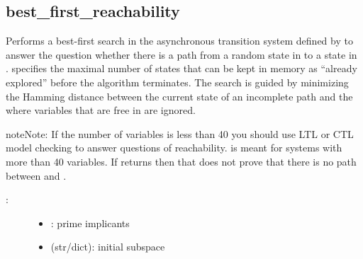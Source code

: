 \documentclass[letterpaper,10pt,english]{sphinxmanual}
\begin{document}
\subsection{best\_first\_reachability}
\label{\detokenize{StateTransitionGraphs:id7}}\label{\detokenize{StateTransitionGraphs:best-first-reachability}}

\begin{fulllineitems}
\label{\detokenize{StateTransitionGraphs:PyBoolNet.StateTransitionGraphs.best_first_reachability}}
Performs a best-first search in the asynchronous transition system defined by  to answer the question whether there
is a path from a random state in  to a state in .
 specifies the maximal number of states that can be kept in memory as “already explored” before the algorithm terminates.
The search is guided by minimizing the Hamming distance between the current state of an incomplete path and the 
where variables that are free in  are ignored.

\begin{sphinxadmonition}{note}{Note:}
If the number of variables is less than 40 you should use LTL or CTL model checking to answer questions of reachability.
{\hyperref[\detokenize{StateTransitionGraphs:best-first-reachability}]{}} is meant for systems with more than 40 variables.
If {\hyperref[\detokenize{StateTransitionGraphs:best-first-reachability}]{}} returns  then that does not prove that there is no path between  and .
\end{sphinxadmonition}
\begin{description}
\item[{:}] \leavevmode\begin{itemize}
\item {} 
: prime implicants

\item {} 
 (str/dict): initial subspace


\end{itemize}
\end{description}
\end{fulllineitems}
\end{document}
